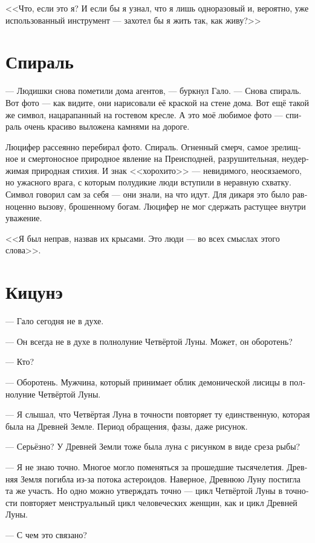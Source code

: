 \documentclass[a4paper,12pt,fleqn]{book}\usepackage{cooltooltips}\usepackage{polyglossia}\setdefaultlanguage[babelshorthands=true]{russian}\setotherlanguage{english}\defaultfontfeatures{Ligatures=TeX,Mapping=tex-text} \usepackage{xcolor}\definecolor{lightgray}{HTML}{bbbbbb}\color{lightgray}\newcommand{\ml}[3]{\textenglish{\textcolor{black}{#3}}}
\begin{document}
{<<Что, если это я?
И если бы я узнал, что я лишь одноразовый и, вероятно, уже использованный инструмент --- захотел бы я жить так, как живу?>>

\section{Спираль}

--- Людишки снова пометили дома агентов, --- буркнул Гало.
--- Снова спираль.
Вот фото --- как видите, они нарисовали её краской на стене дома.
Вот ещё такой же символ, нацарапанный на гостевом кресле.
А это моё любимое фото --- спираль очень красиво выложена камнями на дороге.

Люцифер рассеянно перебирал фото.
Спираль.
Огненный смерч, самое зрелищное и смертоносное природное явление на Преисподней, разрушительная, неудержимая природная стихия.
И знак <<хорохито>> --- невидимого, неосязаемого, но ужасного врага, с которым полудикие люди вступили в неравную схватку.
Символ говорил сам за себя --- они знали, на что идут.
Для дикаря это было равноценно вызову, брошенному богам.
Люцифер не мог сдержать растущее внутри уважение.

<<Я был неправ, назвав их крысами.
Это люди --- во всех смыслах этого слова>>.

\section{Кицунэ}

--- Гало сегодня не в духе.

--- Он всегда не в духе в полнолуние Четвёртой Луны.
Может, он оборотень?

--- Кто?

--- Оборотень.
Мужчина, который принимает облик демонической лисицы в полнолуние Четвёртой Луны.

--- Я слышал, что Четвёртая Луна в точности повторяет ту единственную, которая была на Древней Земле.
Период обращения, фазы, даже рисунок.

--- Серьёзно?
У Древней Земли тоже была луна с рисунком в виде среза рыбы?

--- Я не знаю точно.
Многое могло поменяться за прошедшие тысячелетия.
Древняя Земля погибла из-за потока астероидов.
Наверное, Древнюю Луну постигла та же участь.
Но одно можно утверждать точно --- цикл Четвёртой Луны в точности повторяет менструальный цикл человеческих женщин, как и цикл Древней Луны.

--- С чем это связано?

}
\end{document}
